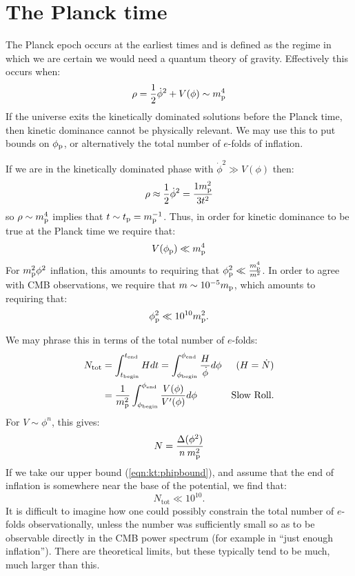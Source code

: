 \section{The Planck time}
The Planck epoch occurs at the earliest times and is defined as the
regime in which we are certain we would need a quantum theory of
gravity. Effectively this occurs when:
\begin{equation}
  \rho = \frac{1}{2}\dot\phi^2 + V(\phi)  \sim m_{\mathrm{p}}^4
  \label{eqn:kt:rhosim}
\end{equation}
If the universe exits the kinetically dominated solutions before the
Planck time, then kinetic dominance cannot be physically relevant. We
may use this to put bounds on $\phi_{\mathrm{p}}$, or alternatively the total
number of $e$-folds of inflation.

If we are in the kinetically dominated phase with $\dot{\phi}^2\gg
V(\phi)$ then:
\begin{equation}
              \rho \approx \frac{1}{2}\dot\phi^2= \frac{1m_{\mathrm{p}}^2}{3t^2} 
  \label{eqn:kt:rhop}
\end{equation}
so $\rho\sim m_{\mathrm{p}}^4$ implies that $t\sim t_{\mathrm{p}}=m_{\mathrm{p}}^{-1}$. Thus, in order for
kinetic dominance to be true at the Planck time we require that:
\begin{equation}
  V(\phi_{\mathrm{p}}) \ll m_{\mathrm{p}}^4
\end{equation}
For $m_{\mathrm{p}}^2\phi^2$ inflation, this amounts to requiring that $\phi_{\mathrm{p}}^2\ll
\frac{m_{\mathrm{p}}^4}{m^2}$. In order to agree with CMB observations, we require
that $m\sim10^{-5}m_{\mathrm{p}}$, which amounts to requiring that:
\begin{equation}
 \phi_{\mathrm{p}}^2 \ll 10^{10}m_{\mathrm{p}}^2 \nonumber.
 \label{eqn:kt:phipbound}
\end{equation}

We may phrase this in terms of the total number of $e$-folds:
\begin{align}
  N_\mathrm{tot} 
  &=\int_{t_\mathrm{begin}}^{t_\mathrm{end}} H dt 
  =\int_{\phi_\mathrm{begin}}^{\phi_\mathrm{end}} 
       \frac{H}{\dot{\phi}}d\phi  &\text{($H=\dot{N}$)}
  \\
  &=\frac{1}{m_{\mathrm{p}}^2}\int_{\phi_\mathrm{begin}}^{\phi_\mathrm{end}}
     {\frac{V(\phi)}{V^\prime(\phi)}}d\phi &\text{Slow Roll.}
\end{align}
For $V\sim\phi^n$, this gives:
\begin{equation}
  N = \frac{\Delta (\phi^2) }{n\:m_{\mathrm{p}}^2}
\end{equation}
If we take our upper bound (\ref{eqn:kt:phipbound}), and assume that the
end of inflation is somewhere near the base of the potential, we find
that: 
\begin{equation}
  N_\mathrm{tot}\ll 10^{10}.
\end{equation}
It is difficult to imagine how one could possibly constrain the total
number of $e$-folds observationally, unless the number was
sufficiently small so as to be observable directly in the CMB power
spectrum (for example in ``just enough inflation''). There are
theoretical limits, but these typically tend to be much, much larger
than this.

